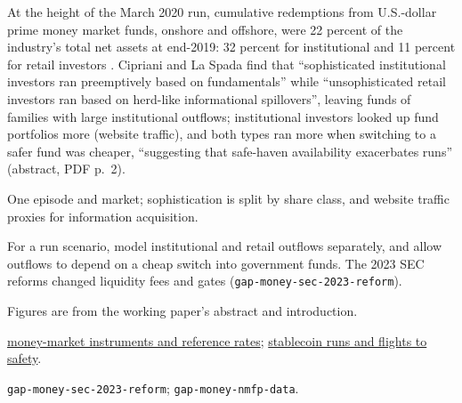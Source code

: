 \begin{qfevidence}\label{ev:money-fund-runs}
 At the height of the March 2020 run, cumulative redemptions from U.S.-dollar prime money market funds, onshore and offshore, were 22 percent of the industry's total net assets at end-2019: 32 percent for institutional and 11 percent for retail investors \citep[Staff Report~956, December 2020, revised April 2024, sec.~1, PDF p.~3]{gap-money-prime-fund-runs}. Cipriani and La Spada find that ``sophisticated institutional investors ran preemptively based on fundamentals'' while ``unsophisticated retail investors ran based on herd-like informational spillovers'', leaving funds of families with large institutional outflows; institutional investors looked up fund portfolios more (website traffic), and both types ran more when switching to a safer fund was cheaper, ``suggesting that safe-haven availability exacerbates runs'' (abstract, PDF p.~2).

 One episode and market; sophistication is split by share class, and website traffic proxies for information acquisition.

 For a run scenario, model institutional and retail outflows separately, and allow outflows to depend on a cheap switch into government funds. The 2023 SEC reforms changed liquidity fees and gates (\nolinkurl{gap-money-sec-2023-reform}).

 Figures are from the working paper's abstract and introduction.

 \hyperref[def:money-market-reference-rates]{money-market instruments and reference rates}; \hyperref[ev:stablecoin-runs]{stablecoin runs and flights to safety}.

 \nolinkurl{gap-money-sec-2023-reform}; \nolinkurl{gap-money-nmfp-data}.

\end{qfevidence}

